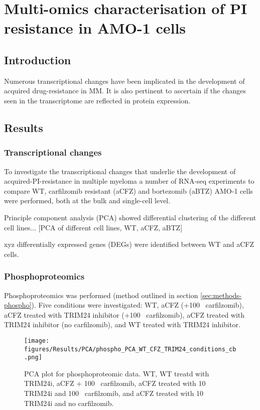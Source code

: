 \chapter{\label{ch:6-results}Multi-omics characterisation of PI resistance in AMO-1 cells}


\section{Introduction}\label{sec:omics-intro}
Numerous transcriptional changes have been implicated in the development of acquired drug-resistance in MM.
It is also pertinent to ascertain if the changes seen in the transcriptome are reflected in protein expression.

\section{Results}\label{sec:omics-results}

\subsection{Transcriptional changes}\label{sec:omics-transcriptomics}
To investigate the transcriptional changes that underlie the development of acquired-PI-resistance in multiple myeloma a number of RNA-seq experiments to compare WT, carfilzomib resistant (aCFZ) and bortezomib (aBTZ) AMO-1 cells were performed, both at the bulk and single-cell level.

Principle component analysis (PCA) showed differential clustering of the different cell lines...
[PCA of different cell lines, WT, aCFZ, aBTZ]




xyz differentially expressed genes (DEGs) were identified between WT and aCFZ cells.


\subsection{Phosphoproteomics}\label{subsec:omics-phospho}
Phosphoproteomics was performed (method outlined in section \ref{sec:methods-phospho}).
Five conditions were investigated: WT, aCFZ (+100\si{\nano\Molar} carfilzomib), aCFZ treated with TRIM24 inhibitor (+100\si{\nano\Molar} carfilzomib), aCFZ treated with TRIM24 inhibitor (no carfilzomib), and WT treated with TRIM24 inhibitor.

\begin{figure}[htb]
\centering
\texttt{[image: figures/Results/PCA/phospho\_PCA\_WT\_CFZ\_TRIM24\_conditions\_cb.png]}
\caption[Phosphoproteomics PCA]{PCA plot for phosphoproteomic data.
WT, WT treatd with TRIM24i, aCFZ + 100\si{\nano\Molar} carfilzomib, aCFZ treated with 10\si{\mu\Molar} TRIM24i and 100\si{\nano\Molar} carfilzomib, and aCFZ treated with 10\si{\micro\Molar} TRIM24i and no carfilzomib.}
\label{fig:phospho_PCA}
\end{figure}


